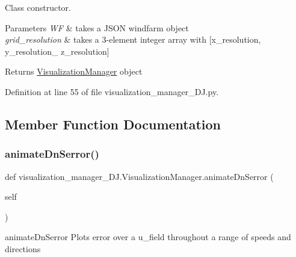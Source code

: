 Class constructor. 


\begin{DoxyParams}{Parameters}
{\em WF} & takes a J\+S\+ON windfarm object \\
\hline
{\em grid\+\_\+resolution} & takes a 3-\/element integer array with \mbox{[}x\+\_\+resolution, y\+\_\+resolution\+\_\+ z\+\_\+resolution\mbox{]} \\
\hline
\end{DoxyParams}
\begin{DoxyReturn}{Returns}
\mbox{\hyperlink{classvisualization__manager___d_j_1_1_visualization_manager}{Visualization\+Manager}} object 
\end{DoxyReturn}


Definition at line 55 of file visualization\+\_\+manager\+\_\+\+D\+J.\+py.



\subsection{Member Function Documentation}
\mbox{\label{classvisualization__manager___d_j_1_1_visualization_manager_ab660449be49e49325d864dd1176e83f0}} 
\subsubsection{\texorpdfstring{animate\+Dn\+Serror()}{animateDnSerror()}}
{\footnotesize\ttfamily def visualization\+\_\+manager\+\_\+\+D\+J.\+Visualization\+Manager.\+animate\+Dn\+Serror (\begin{DoxyParamCaption}\item[{}]{self }\end{DoxyParamCaption})}



animate\+Dn\+Serror Plots error over a u\+\_\+field throughout a range of speeds and directions 


